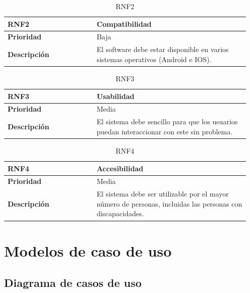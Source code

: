 \begin{table}[H]
	\centering %
	\begin{tabular}{|p{0.35\linewidth}|p{0.6\linewidth}|}
		\hline
		\rowcolor{grayshade} \textbf{RNF2} & \textbf{Compatibilidad} \\
		\hline
		\textbf{Prioridad} & Baja \\
		\hline
		\textbf{Descripción} & El software debe estar disponible en varios sistemas operativos (Android e IOS).\\
		\hline
	\end{tabular}
	\caption{RNF2}
\end{table}

\begin{table}[H]
	\centering %
	\begin{tabular}{|p{0.35\linewidth}|p{0.6\linewidth}|}
		\hline
		\rowcolor{grayshade} \textbf{RNF3} & \textbf{Usabilidad} \\
		\hline
		\textbf{Prioridad} & Media \\
		\hline
		\textbf{Descripción} & El sistema debe sencillo para que los usuarios puedan interaccionar con este sin problema.\\
		\hline
	\end{tabular}
	\caption{RNF3}
\end{table}

\begin{table}[H]
	\centering %
	\begin{tabular}{|p{0.35\linewidth}|p{0.6\linewidth}|}
		\hline
		\rowcolor{grayshade} \textbf{RNF4} & \textbf{Accesibilidad} \\
		\hline
		\textbf{Prioridad} & Media \\
		\hline
		\textbf{Descripción} & El sistema debe ser utilizable por el mayor número de personas, incluidas las personas con discapacidades.\\
		\hline
	\end{tabular}
	\caption{RNF4}
\end{table}

\newpage

\section{Modelos de caso de uso}

\subsection{Diagrama de casos de uso}

